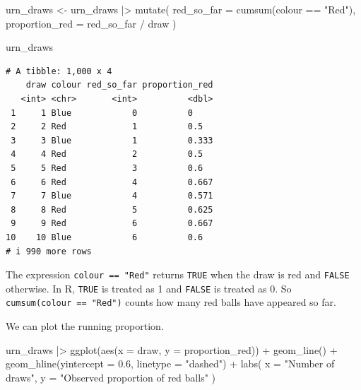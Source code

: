 \documentclass[
  letterpaper,
  DIV=11,
  numbers=noendperiod]{scrreprt}
\newenvironment{Shaded}{\begin{snugshade}}{\end{snugshade}}
\newcommand{\AttributeTok}[1]{\textcolor[rgb]{0.40,0.45,0.13}{#1}}
\newcommand{\FloatTok}[1]{\textcolor[rgb]{0.68,0.00,0.00}{#1}}
\newcommand{\FunctionTok}[1]{\textcolor[rgb]{0.28,0.35,0.67}{#1}}
\newcommand{\NormalTok}[1]{\textcolor[rgb]{0.00,0.23,0.31}{#1}}
\newcommand{\OtherTok}[1]{\textcolor[rgb]{0.00,0.23,0.31}{#1}}
\newcommand{\SpecialCharTok}[1]{\textcolor[rgb]{0.37,0.37,0.37}{#1}}
\newcommand{\StringTok}[1]{\textcolor[rgb]{0.13,0.47,0.30}{#1}}
\begin{document}
\begin{Shaded}
\begin{Highlighting}[]
\NormalTok{urn\_draws }\OtherTok{\textless{}{-}}\NormalTok{ urn\_draws }\SpecialCharTok{|\textgreater{}}
  \FunctionTok{mutate}\NormalTok{(}
    \AttributeTok{red\_so\_far =} \FunctionTok{cumsum}\NormalTok{(colour }\SpecialCharTok{==} \StringTok{"Red"}\NormalTok{),}
    \AttributeTok{proportion\_red =}\NormalTok{ red\_so\_far }\SpecialCharTok{/}\NormalTok{ draw}
\NormalTok{  )}

\NormalTok{urn\_draws}
\end{Highlighting}
\end{Shaded}

\begin{verbatim}
# A tibble: 1,000 x 4
    draw colour red_so_far proportion_red
   <int> <chr>       <int>          <dbl>
 1     1 Blue            0          0    
 2     2 Red             1          0.5  
 3     3 Blue            1          0.333
 4     4 Red             2          0.5  
 5     5 Red             3          0.6  
 6     6 Red             4          0.667
 7     7 Blue            4          0.571
 8     8 Red             5          0.625
 9     9 Red             6          0.667
10    10 Blue            6          0.6  
# i 990 more rows
\end{verbatim}

The expression \texttt{colour\ ==\ "Red"} returns \texttt{TRUE} when the
draw is red and \texttt{FALSE} otherwise. In R, \texttt{TRUE} is treated
as 1 and \texttt{FALSE} is treated as 0. So
\texttt{cumsum(colour\ ==\ "Red")} counts how many red balls have
appeared so far.

We can plot the running proportion.

\begin{Shaded}
\begin{Highlighting}[]
\NormalTok{urn\_draws }\SpecialCharTok{|\textgreater{}}
  \FunctionTok{ggplot}\NormalTok{(}\FunctionTok{aes}\NormalTok{(}\AttributeTok{x =}\NormalTok{ draw, }\AttributeTok{y =}\NormalTok{ proportion\_red)) }\SpecialCharTok{+}
  \FunctionTok{geom\_line}\NormalTok{() }\SpecialCharTok{+}
  \FunctionTok{geom\_hline}\NormalTok{(}\AttributeTok{yintercept =} \FloatTok{0.6}\NormalTok{, }\AttributeTok{linetype =} \StringTok{"dashed"}\NormalTok{) }\SpecialCharTok{+}
  \FunctionTok{labs}\NormalTok{(}
    \AttributeTok{x =} \StringTok{"Number of draws"}\NormalTok{,}
    \AttributeTok{y =} \StringTok{"Observed proportion of red balls"}
\NormalTok{  )}
\end{Highlighting}
\end{Shaded}
\end{document}
